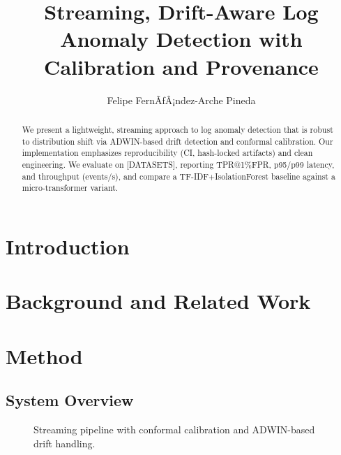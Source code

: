 \documentclass[10pt,twocolumn]{article}
\title{Streaming, Drift-Aware Log Anomaly Detection with Calibration and Provenance}
\author{Felipe FernÃƒÂ¡ndez-Arche Pineda}
\date{} %
\begin{document}
\maketitle

\begin{abstract}
We present a lightweight, streaming approach to log anomaly detection that is
robust to distribution shift via ADWIN-based drift detection and conformal
calibration. Our implementation emphasizes reproducibility (CI, hash-locked
artifacts) and clean engineering. We evaluate on [DATASETS], reporting
TPR@1\%FPR, p95/p99 latency, and throughput (events/s), and compare a
TF-IDF+IsolationForest baseline against a micro-transformer variant.
\end{abstract}

\section{Introduction}

\section{Background and Related Work}

\section{Method}
\subsection{System Overview}
\begin{figure}[t]
  \centering
  \caption{Streaming pipeline with conformal calibration and ADWIN-based drift handling.}
  \label{fig:pipeline}
\end{figure}
\end{document}
